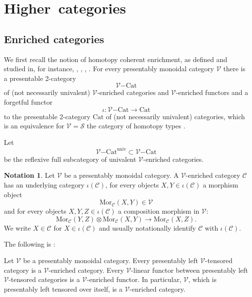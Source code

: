 \documentclass[10pt,oneside]{article}
\numberwithin{equation}{section} %
\numberwithin{figure}{section} %
\theoremstyle{plain}
\theoremstyle{definition}
\newtheorem{notation}[thm]{Notation}
\newcommand{\mC}{{\mathcal C}}
\newcommand{\mS}{{\mathcal S}}
\newcommand{\mV}{{\mathcal V}}
\newcommand{\X}{X}
\newcommand{\ot}{\otimes}
\newcommand{\univ}{\mathrm{univ}}
\newcommand{\Cat}{\mathrm{Cat}}
\newcommand{\Mor}{{\mathrm{Mor}}}
\begin{document}
\section{\mbox{Higher categories}}

\subsection{Enriched categories}

We first recall the notion of homotopy coherent enrichment, as defined and studied in, for instance, \cite{MR3345192}, \cite{heine2024higher}, \cite{heine2025equivalence}, \cite{HINICH2020107129}.
For every presentably monoidal category $\mV$ there is a presentable 2-category $${\mV\mathrm{-}\Cat}$$ of (not necessarily univalent) $\mV$-enriched categories and $\mV$-enriched functors and a forgetful functor $$ \iota:{\mV\mathrm{-}\Cat} \to \Cat$$ to the presentable 2-category $\Cat$ of (not necessarily univalent) categories,
which is an equivalence for $\mV= \mS$ the category of homotopy types \cite[Corollary 3.23.]{heine2024bienriched}. 

Let $${\mV\mathrm{-}\Cat}^\univ \subset {\mV\mathrm{-}\Cat}$$ be the reflexive full subcategory of univalent $\mV$-enriched categories.



\begin{notation}Let $\mV$ be a presentably monoidal category.
A $\mV$-enriched category $\mC$ has an underlying category $\iota(\mC)$, for every objects $X,Y \in \iota(\mC)$ a morphism object 
$$\Mor_\mC(X, Y) \in \mV$$
and for every objects $X,Y,Z \in \iota(\mC)$ a composition morphism in $\mV:$
$$\Mor_\mC(Y, Z) \ot \Mor_\mC(X, Y) \to \Mor_\mC(X, Z).$$
We write $\X \in \mC$ for $\X \in \iota(\mC)$ and usually notationally identify $\mC$ with $\iota(\mC).$


	
\end{notation}


The following is \cite[Example 2.134]{heine2024bienriched}:

\begin{example}\label{linenr}
Let $\mV$ be a presentably monoidal category. Every presentably left $\mV$-tensored category is a $\mV$-enriched category.
Every $\mV$-linear functor between presentably left $\mV$-tensored categories is a $\mV$-enriched functor.
In particular, $\mV$, which is presentably left tensored over itself, is a $\mV$-enriched category.

\end{example}
\end{document}
